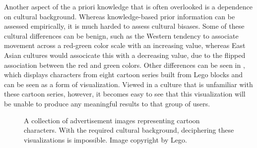 Another aspect of the a priori knowledge that is often overlooked is a dependence on cultural background.  Whereas knowledge-based prior information can be assessed empirically, it is much harded to assess cultural bisases.  Some of these cultural differences can be benign, such as the Western tendency to associate movement across a red-green color scale with an increasing value, whereas East Asian cultures would associcate this with a decreasing value, due to the flipped association between the red and green colors.  Other differences can be seen in , which displays characters from eight cartoon series built from Lego blocks and can be seen as a form of visualization.  Viewed in a culture that is unfamiliar with these cartoon series, however, it becomes easy to see that this visualization will be unable to produce any meaningful results to that group of users.

\begin{figure}
  \centering
  \caption{A collection of advertisement images representing cartoon characters. With the required cultural background, deciphering these visualizations is impossible. Image copyright by Lego.}
  \label{fig:intro:vis:lego}
\end{figure}


